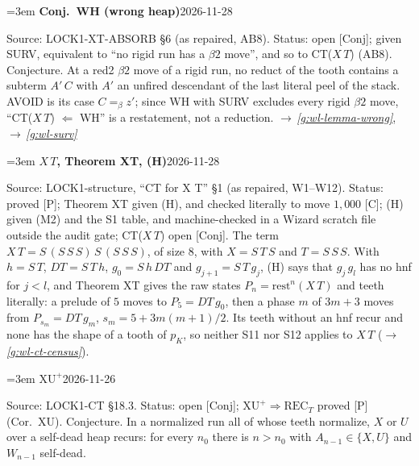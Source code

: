 \documentclass[11pt]{amsart}
\makeatletter
\newcommand{\conv}{=_\beta}
\newcommand{\rest}{\mathrm{rest}}
\newcounter{sense}
\newenvironment{entry}[3]{%
  \par\addvspace{\medskipamount}\noindent\phantomsection
  \def\@currentlabel{#2}\label{#1}\setcounter{sense}{0}\raggedright\emergencystretch=3em%
  \textbf{#2}\hfill{\footnotesize\textsf{#3}}\par\nopagebreak\noindent\ignorespaces}%
  {\par}
\newcommand{\src}[1]{\textsf{Source:} #1.\enskip}
\newcommand{\status}[1]{\textsf{Status:} #1.\enskip}
\renewcommand{\see}[1]{$\rightarrow$\,\emph{\ref{#1}}}
\makeatother
\begin{document}
\begin{entry}{g:wl-wh}{Conj.~WH (wrong heap)}{2026-11-28}
\src{LOCK1-XT-ABSORB \S6 (as repaired, AB8)}
\status{open [Conj]; given SURV, equivalent to ``no rigid run has a $\beta2$ move'', and so to CT($X\,T$)
(AB8)}
Conjecture. At a red2 $\beta2$ move of a rigid run, no reduct of the tooth contains a subterm $A'\,C$ with
$A'$ an unfired descendant of the last literal peel of the stack. AVOID is its case $C\conv z'$; since WH
with SURV excludes every rigid $\beta2$ move, ``CT($X\,T$) $\Leftarrow$ WH'' is a restatement, not a
reduction. \see{g:wl-lemma-wrong}, \see{g:wl-surv}
\end{entry}

\begin{entry}{g:wl-xt}{$X\,T$, Theorem XT, (H)}{2026-11-28}
\src{LOCK1-structure, ``CT for X T'' \S1 (as repaired, W1--W12)}
\status{proved [P]; Theorem XT given (H), and checked literally to move $1{,}000$ [C]; (H) given (M2) and
the S1 table, and machine-checked in a Wizard scratch file outside the audit gate; CT($X\,T$) open [Conj]}
The term $X\,T=S\,(S\,S\,S)\,S\,(S\,S\,S)$, of size $8$, with $X=S\,T\,S$ and $T=S\,S\,S$. With $h=S\,T$, $DT=S\,T\,h$,
$g_0=S\,h\,DT$ and $g_{j+1}=S\,T\,g_j$, (H) says that $g_j\,g_l$ has no hnf for $j<l$, and Theorem XT gives
the raw states $P_n=\rest^n(X\,T)$ and teeth literally: a prelude of $5$ moves to $P_5=DT\,g_0$, then a
phase $m$ of $3m+3$ moves from $P_{s_m}=DT\,g_m$, $s_m=5+3m(m+1)/2$. Its teeth without an hnf recur and none
has the shape of a tooth of $p_K$, so neither S11 nor S12 applies to $X\,T$ (\see{g:wl-ct-census}).
\end{entry}

\begin{entry}{g:wl-xu-plus}{$\mathrm{XU}^{+}$}{2026-11-26}
\src{LOCK1-CT \S18.3}
\status{open [Conj]; $\mathrm{XU}^{+}\Rightarrow\mathrm{REC}_T$ proved [P] (Cor.~XU)}
Conjecture. In a normalized run all of whose teeth normalize, $X$ or $U$ over a self-dead heap recurs:
for every $n_0$ there is $n>n_0$ with $A_{n-1}\in\{X,U\}$ and $W_{n-1}$ self-dead.
\end{entry}



\end{document}
